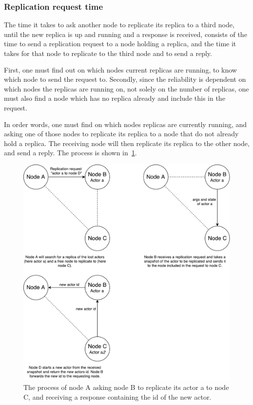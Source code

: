 \documentclass{cslthse-msc}
\begin{document}

\subsubsection{Replication request time} \label{sec:replication_time}
The time it takes to ask another node to replicate its replica to a third node, until the new replica is up and running and a response is received, consists of the time to send a replication request to a node holding a replica, and the time it takes for that node to replicate to the third node and to send a reply.

First, one must find out on which nodes current replicas are running, to know which node to send the request to. Secondly, since the reliability is dependent on which nodes the replicas are running on, not solely on the number of replicas, one must also find a node which has no replica already and include this in the request.

In order words, one must find on which nodes replicas are currently running, and asking one of those nodes to replicate its replica to a node that do not already hold a replica. The receiving node will then replicate its replica to the other node, and send a reply. The process is shown in~\cref{fig:replication_request}.

\begin{figure}[!hbt]
\centering
\includegraphics[scale=0.5]{images/replication_request.pdf}
\caption{The process of node A asking node B to replicate its actor a to node C, and receiving a response containing the id of the new actor.}\label{fig:replication_request}
\end{figure}
\end{document}
